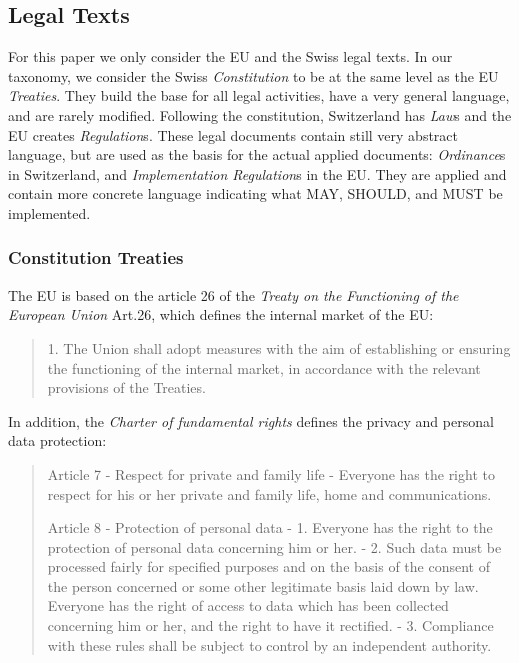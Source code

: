 \subsection{Legal Texts} 

For this paper we only consider the EU and the Swiss legal texts.
In our taxonomy, we consider the Swiss \emph{Constitution} to be
at the same level as the EU \emph{Treaties}.
They build the base for all legal activities, have a very general
language, and are rarely modified.
Following the constitution, Switzerland has \emph{Law}s and the EU
creates \emph{Regulation}s.
These legal documents contain still very abstract language, but
are used as the basis for the actual applied documents:
\emph{Ordinance}s in Switzerland, and 
\emph{Implementation Regulation}s in the EU.
They are applied and contain more concrete language
indicating what MAY, SHOULD, and MUST be implemented.

\vspace{1cm}


\subsubsection{Constitution Treaties}

The EU \eid is based on the article 26 of the \emph{Treaty on the Functioning of the European Union}
\cite{EUTreaties}{Art.26}, which defines the internal market of the EU:
\begin{quote}
    1.   The Union shall adopt measures with the aim of establishing or ensuring the functioning of the internal market, in accordance with the relevant provisions of the Treaties.
\end{quote}
In addition, the \emph{Charter of fundamental rights} defines the privacy and personal data protection:
\begin{quote}
    Article 7 - Respect for private and family life - Everyone has the right to respect for his or her private and family life, home and communications.
    
    Article 8 - Protection of personal data - 1.   Everyone has the right to the protection of personal data concerning him or her.
    - 2.   Such data must be processed fairly for specified purposes and on the basis of the consent of the person concerned or some other legitimate basis laid down by law. Everyone has the right of access to data which has been collected concerning him or her, and the right to have it rectified. - 3.   Compliance with these rules shall be subject to control by an independent authority.
\end{quote}

